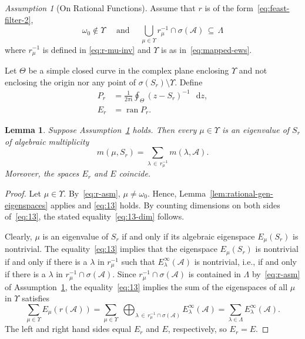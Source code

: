 \documentclass[12pt, oneside, reqno]{amsart}
\newtheorem{lemma}[theorem]{Lemma}
\theoremstyle{remark}
\newtheorem{assumption}[theorem]{Assumption}
\newcommand{\ii}{\mathfrak{i}}
\newcommand{\diff}{\mathop{}\!\mathrm{d}}
\DeclareMathOperator{\ran}{ran}
\newcommand{\vL}{\varLambda}
\newcommand{\vT}{\varTheta}
\newcommand{\vU}{\varUpsilon}
\newcommand{\dz}{\diff{z}}
\newcommand{\Ac}{\mathcal{A}}
\newcommand{\og}{\omega}
\begin{document}
\begin{assumption}[On Rational Functions]
  \label{asm:r-asm}
  Assume that $r$ is of the form~\eqref{eq:feast-filter-2}, 
  \begin{equation}
    \label{eq:r-asm}
    \og_0 \notin \vU \quad\text { and } \quad
    \bigcup_{\mu \in \vU} r_\mu^{-1}\cap \sigma(\Ac) \,\subseteq\, \vL
  \end{equation}
  where $r_\mu^{-1}$ is defined in \eqref{eq:r-mu-inv}
  and $\vU$ is as in~\eqref{eq:mapped-ews}.
\end{assumption}

Let $\vT$ be a simple closed
curve in the complex plane enclosing $\vU$ and not enclosing the
origin nor any point of $\sigma(S_r) \setminus \vU$. Define
\begin{align*}
  P_r & = \frac{1}{2\pi \ii} \oint_\vT( z - S_r)^{-1}\, \dz,
  \\
  E_r & = \ran P_r.
\end{align*}



\begin{lemma}
  \label{lem:E=Er}
  Suppose Assumption~\ref{asm:r-asm} holds. Then every $\mu \in \vU$ is an
  eigenvalue of $S_r$ of algebraic multiplicity
  \begin{equation}
    \label{eq:13-dim}
    m(\mu, S_r) = \sum_{\lambda \,\in\, r^{-1}_\mu}   m(\lambda, \Ac).
  \end{equation}
  Moreover, the spaces  $E_r$ and $E$ coincide.
\end{lemma}
\begin{proof}
  Let $\mu \in \vU$.  By~\eqref{eq:r-asm}, $\mu \ne \og_0$.  Hence,
  Lemma~\ref{lem:rational-gen-eigenspaces} applies and \eqref{eq:13}
  holds.    By counting dimensions on both sides
  of~\eqref{eq:13}, the stated equality~\eqref{eq:13-dim} follows.
  

  Clearly, $\mu$ is an eigenvalue of $S_r$ if and only if its
  algebraic eigenspace $E_\mu(S_r)$ is nontrivial.  The
  equality~\eqref{eq:13} implies that the eigenspace $E_\mu(S_r)$ is
  nontrivial if and only if there is a $\lambda$ in $r_\mu^{-1}$ such
  that $E_\lambda^\infty(\Ac)$ is nontrivial, i.e., if and only if
  there is a $\lambda$ in $r_\mu^{-1} \cap \sigma(\Ac).$ Since
  $r_\mu^{-1} \cap \sigma(\Ac)$ is contained in $\vL$
  by~\eqref{eq:r-asm} of Assumption~\ref{asm:r-asm}, the
  equality~\eqref{eq:13} implies the sum of the eigenspaces of all
  $\mu$ in $\vU$ satisfies   
  \[
    \sum_{\mu \in \vU}
    E_\mu(r(\Ac)) =
    \sum_{\mu \in \vU}\;
    \bigoplus_{\lambda \,\in\, r^{-1}_\mu \cap \sigma(\Ac) }
    E_\lambda^\infty (\Ac)
    =
    \sum_{\lambda \in \vL} E_\lambda^\infty (\Ac).
  \]
  The left and right hand sides equal $E_r$ and $E$, respectively, so $E_r = E$.
\end{proof}
\end{document}
